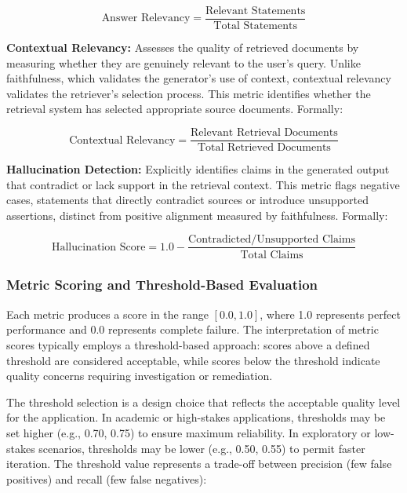 \begin{equation}
\text{Answer Relevancy} = \frac{\text{Relevant Statements}}{\text{Total Statements}}
\end{equation}

\textbf{Contextual Relevancy:} Assesses the quality of retrieved documents by measuring whether they are genuinely relevant to the user's query. Unlike faithfulness, which validates the generator's use of context, contextual relevancy validates the retriever's selection process. This metric identifies whether the retrieval system has selected appropriate source documents. Formally:

\begin{equation}
\text{Contextual Relevancy} = \frac{\text{Relevant Retrieval Documents}}{\text{Total Retrieved Documents}}
\end{equation}

\textbf{Hallucination Detection:} Explicitly identifies claims in the generated output that contradict or lack support in the retrieval context. This metric flags negative cases, statements that directly contradict sources or introduce unsupported assertions, distinct from positive alignment measured by faithfulness. Formally:

\begin{equation}
\text{Hallucination Score} = 1.0 - \frac{\text{Contradicted/Unsupported Claims}}{\text{Total Claims}}
\end{equation}

\subsubsection{Metric Scoring and Threshold-Based Evaluation}

Each metric produces a score in the range \([0.0, 1.0]\), where 1.0 represents perfect performance and 0.0 represents complete failure. The interpretation of metric scores typically employs a threshold-based approach: scores above a defined threshold are considered acceptable, while scores below the threshold indicate quality concerns requiring investigation or remediation.

The threshold selection is a design choice that reflects the acceptable quality level for the application. In academic or high-stakes applications, thresholds may be set higher (e.g., 0.70, 0.75) to ensure maximum reliability. In exploratory or low-stakes scenarios, thresholds may be lower (e.g., 0.50, 0.55) to permit faster iteration. The threshold value represents a trade-off between precision (few false positives) and recall (few false negatives):

